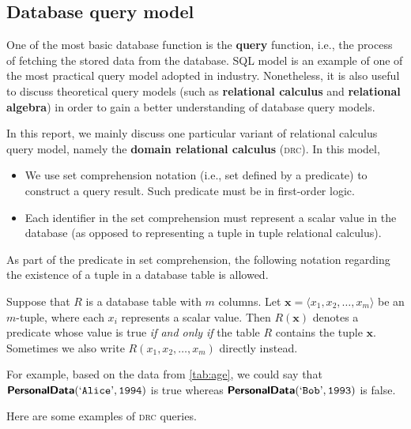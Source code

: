 \newpage
\subsection{Database query model}

One of the most basic database function is the \textbf{query} function, i.e., the process of fetching the stored data from the database. SQL model is an example of one of the most practical query model adopted in industry. Nonetheless, it is also useful to discuss theoretical query models (such as \textbf{relational calculus} and \textbf{relational algebra}) in order to gain a better understanding of database query models.

In this report, we mainly discuss one particular variant of relational calculus query model, namely the \textbf{domain relational calculus} (\textsc{drc}). In this model,
\begin{itemize}[topsep=0.5pc,itemsep=0.25pc]
    \item  We use set comprehension notation (i.e., set defined by a predicate) to construct a query result. Such predicate must be in first-order logic.
    \item  Each identifier in the set comprehension must represent a scalar value in the database (as opposed to representing a tuple in tuple relational calculus).
\end{itemize}

\label{psec:table-name-pred}
As part of the predicate in set comprehension, the following notation regarding the existence of a tuple in a database table is allowed.

\begin{notation}
    Suppose that $R$ is a database table with $m$ columns. Let $\boldsymbol{x} = \langle x_1, x_2, \ldots, x_m \rangle$ be an $m$-tuple, where each $x_i$ represents a scalar value. Then $R(\boldsymbol{x})$ denotes a predicate whose value is true \emph{if and only if} the table $R$ contains the tuple $\boldsymbol{x}$. Sometimes we also write $R(x_1, x_2, \ldots, x_m)$ directly instead.
\end{notation}

For example, based on the data from \autoref{tab:age}, we could say that $\text{\textnormal{\textsf{\textbf{PersonalData}}}}(\text{\textnormal{`\ttfamily{Alice}}'}, \text{\textnormal{\ttfamily{1994}}})$ is true whereas $\text{\textnormal{\textsf{\textbf{PersonalData}}}}(\text{\textnormal{`\ttfamily{Bob}}'}, \text{\textnormal{\ttfamily{1993}}})$ is false.

Here are some examples of \textsc{drc} queries.

